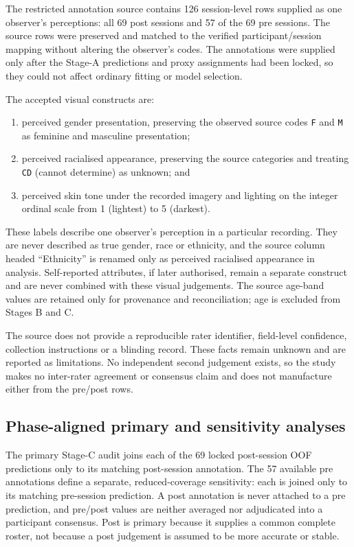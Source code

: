 The restricted annotation source contains 126 session-level rows supplied as one observer's
perceptions: all 69 post sessions and 57 of the 69 pre sessions. The source rows were preserved
and matched to the verified participant/session mapping without altering the observer's codes. The
annotations were supplied only after the Stage-A predictions and proxy assignments had been
locked, so they could not affect ordinary fitting or model selection.

The accepted visual constructs are:
\par\noindent\begin{minipage}{\linewidth}
\begin{enumerate}
    \item perceived gender presentation, preserving the observed source codes \texttt{F} and
    \texttt{M} as feminine and masculine presentation;
    \item perceived racialised appearance, preserving the source categories and treating
    \texttt{CD} (cannot determine) as unknown; and
    \item perceived skin tone under the recorded imagery and lighting on the integer ordinal
    scale from 1 (lightest) to 5 (darkest).
\end{enumerate}
\end{minipage}\par
These labels describe one observer's perception in a particular recording. They are never
described as true gender, race or ethnicity, and the source column headed ``Ethnicity'' is renamed
only as perceived racialised appearance in analysis. Self-reported attributes, if later
authorised, remain a separate construct and are never combined with these visual judgements. The
source age-band values are retained only for provenance and reconciliation; age is excluded from
Stages B and C.

The source does not provide a reproducible rater identifier, field-level confidence, collection
instructions or a blinding record. These facts remain unknown and are reported as limitations.
No independent second judgement exists, so the study makes no inter-rater agreement or consensus
claim and does not manufacture either from the pre/post rows.

\subsection{Phase-aligned primary and sensitivity analyses}

The primary Stage-C audit joins each of the 69 locked post-session OOF predictions only to its
matching post-session annotation. The 57 available pre annotations define a separate,
reduced-coverage sensitivity: each is joined only to its matching pre-session prediction. A post
annotation is never attached to a pre prediction, and pre/post values are neither averaged nor
adjudicated into a participant consensus. Post is primary because it supplies a common complete
roster, not because a post judgement is assumed to be more accurate or stable.

